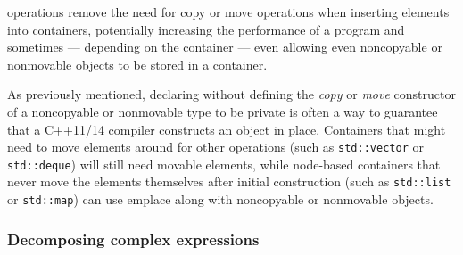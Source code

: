 \noindent {} operations remove the need for copy or move
operations when inserting elements into containers, potentially
increasing the performance of a program and sometimes --- depending on the
container --- even allowing even noncopyable or nonmovable objects to be stored
in a container.

As previously mentioned,
declaring without defining the \emph{copy} or \emph{move} constructor of a
noncopyable or nonmovable type to be private is often a way to guarantee that
a C++11/14 compiler constructs an object in place.
Containers that might need to move elements around for other operations
(such as \lstinline!std::vector! or \lstinline!std::deque!) will still need
movable elements, while node-based containers that never move the
elements themselves after initial construction (such as
\lstinline!std::list! or \lstinline!std::map!) can use emplace along with
noncopyable or nonmovable objects.

\subsubsection[Decomposing complex expressions]{Decomposing complex expressions}\label{decomposing-complex-expressions}

